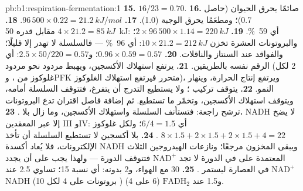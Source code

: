 \begin{solution}{pb:b1:respiration-fermentation:1}
\textbf{15.} $16/23 = 0.70$.
\textbf{16.} صائمًا يحرق الحيوان  (حاصل 0.7)؛ ومطعَمًا يحرق
 الوجبة (1.0).
\textbf{17.} $96\,500\times 0.22 = \qty{21.2}{kJ/mol}$.
\textbf{18.} $4\times 21.2 = \qty{85}{kJ}$ مقابل  قدره
\qty{50}{kJ}: أي \qty{59}{\%}.
\textbf{19.} $2\times 96\,500\times 1.14 = \qty{220}{kJ}$؛ والبروتونات
العشرة تخزن $10\times 21.2 = \qty{212}{kJ}$: أي \qty{96}{\%} ---
فالسلسلة لا تهدر إلا قليلًا؛ والفواقد عند السنتاز والناقلات.
\textbf{20.} $0.96\times 0.59 = 0.57$؛ و$2.5\times 50/220 = 0.57$: أي
الرقم نفسه بالطريقين.
\textbf{21.} يرتفع استهلاك الأكسجين، ويهبط مردود  نحو مردود 
(2 لكل غلوكوز من ، وPFK متحرر فيرتفع استهلاك الغلوكوز)،
ويرتفع إنتاج الحرارة، وينهار النمو.
\textbf{22.} يتوقف تركيب ؛ ولا يستطيع التدرج أن يتفرغ، فتتوقف
السلسلة أمامه، ويتوقف استهلاك الأكسجين، وتخمّر  ما تستطيع. ثم
إضافة فاصل اقتران تدع البروتونات ترشح راجعة: فتستأنف السلسلة واستهلاك
الأكسجين، وما زال بلا .
\textbf{23.} NADH لا يضخ إلا عبر المعقدين III وIV: أي $6/4 = 1.5$؛
ولكل غلوكوز $8\times 1.5 + 2\times 1.5 + 2\times 1.5 + 4 = 22$ .
\textbf{24.} بلا أكسجين لا تستطيع السلسلة أن تأخذ الإلكترونات، فلا
يُعاد أكسدة NADH ويبقى المخزون مرجعًا؛ ونازعات الهيدروجين الثلاث
المعتمدة على  في الدورة لا تجد $\mathrm{NAD^+}$ فتتوقف الدورة ---
ولهذا يجب على  أن يجدد $\mathrm{NAD^+}$ في العصارة ليستمر
.
\textbf{25.} 30  مع الهواء، و2 بدونه: أي نسبة 15؛  تساوي
2.5 عند NADH (10 بروتونات على 4 لكل ) و1.5 عند $\mathrm{FADH_2}$
(6 على 4).
\end{solution}
